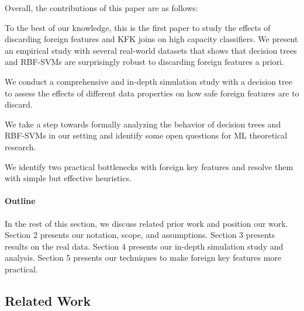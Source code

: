 \vspace{1mm}
\noindent Overall, the contributions of this paper are as follows:

\begin{packeditems}
\item To the best of our knowledge, this is the first paper to study the effects of discarding foreign features and KFK joins on high capacity classifiers.
We present an empirical study with several real-world datasets that shows that decision trees and RBF-SVMs are surprisingly robust to discarding foreign features a priori.

\item We conduct a comprehensive and in-depth simulation study with a decision tree to assess the effects of different data properties on how safe foreign features are to discard.

\item We take a step towards formally analyzing the behavior of decision trees and RBF-SVMs in our setting and identify some open questions for ML theoretical research.

\item We identify two practical bottlenecks with foreign key features and resolve them with simple but effective heuristics.
\end{packeditems}


\paragraph*{\textbf{Outline}} In the rest of this section, we discuss related prior work and position our work. Section 2 presents our notation, scope, and assumptions. 
Section 3 presents results on the real data. Section 4 presents our in-depth simulation study and analysis. Section 5 presents our techniques to make foreign key features
more practical. %

\subsection*{Related Work}


